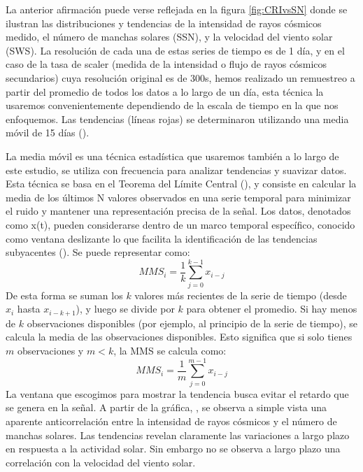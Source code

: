La anterior afirmación puede verse reflejada en la figura \ref{fig:CRIvsSN} donde se ilustran  las distribuciones y tendencias de la intensidad de rayos cósmicos medido, el número de manchas solares (SSN), y la velocidad del viento solar (SWS). La resolución de cada una de estas series de tiempo es de 1 día, y en el caso de la tasa de scaler (medida de la intensidad o flujo de rayos cósmicos secundarios) cuya resolución original es de 300s, hemos realizado un remuestreo a partir del promedio de todos los datos a lo largo de un día, esta técnica la usaremos convenientemente dependiendo de la escala de tiempo en la que nos enfoquemos. Las tendencias (líneas rojas) se determinaron utilizando una media móvil de 15 días (\cite{Oloketuyi_2020}). 

La media móvil es una técnica estadística que usaremos también a lo largo de este estudio, se utiliza con frecuencia para analizar tendencias y suavizar datos. Esta técnica se basa en el Teorema del Límite Central (\cite{Davies_2023}), y consiste en calcular la media de los últimos N valores observados en una serie temporal para minimizar el ruido y mantener una representación precisa de la señal. Los datos, denotados como x(t), pueden considerarse dentro de un marco temporal específico, conocido como ventana deslizante lo que facilita la identificación de las tendencias subyacentes (\cite{wang_2019}). Se puede representar como:
$$
MMS_i = \frac{1}{k} \sum_{j=0}^{k-1} x_{i-j}
$$
De esta forma se suman los $k$ valores más recientes de la serie de tiempo (desde $x_i$ hasta $x_{i-k+1}$), y luego se divide por $k$ para obtener el promedio. Si hay menos de $k$ observaciones disponibles (por ejemplo, al principio de la serie de tiempo), se calcula la media de las observaciones disponibles. Esto significa que si solo tienes $m$ observaciones y $m < k$, la MMS se calcula como:
$$
MMS_i = \frac{1}{m} \sum_{j=0}^{m-1} x_{i-j}
$$
La ventana que escogimos para mostrar la tendencia busca evitar el retardo que se genera en la señal. A partir de la gráfica, , se observa a simple vista una aparente anticorrelación entre la intensidad de rayos cósmicos y el número de manchas solares. Las tendencias revelan claramente las variaciones a largo plazo en respuesta a la actividad solar. Sin embargo no se observa a largo plazo una correlación con la velocidad del viento solar.
